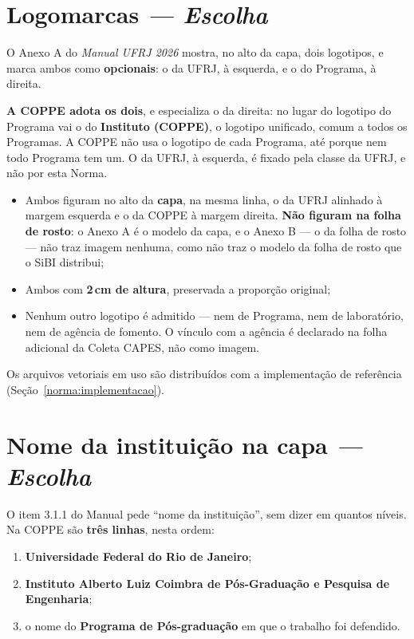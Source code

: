 \documentclass[a4paper,11pt]{article}
\newcommand\tipo[1]{\normalfont\textit{--- #1}}
\begin{document}
\hrulefill

\section{Logomarcas \tipo{Escolha}}

O Anexo A do \textit{Manual UFRJ 2026} mostra, no alto da capa, dois logotipos,
e marca ambos como \textbf{opcionais}: o da UFRJ, à esquerda, e o do Programa,
à direita.

\textbf{A COPPE adota os dois}, e especializa o da direita: no lugar do logotipo
do Programa vai o do \textbf{Instituto (COPPE)}, o logotipo unificado, comum a
todos os Programas. A COPPE não usa o logotipo de cada Programa, até porque nem
todo Programa tem um. O da UFRJ, à esquerda, é fixado pela classe da UFRJ, e não
por esta Norma.

\begin{itemize}[nosep]
  \item Ambos figuram no alto da \textbf{capa}, na mesma linha, o da UFRJ
    alinhado à margem esquerda e o da COPPE à margem direita. \textbf{Não
    figuram na folha de rosto}: o Anexo A é o modelo da capa, e o Anexo B ---
    o da folha de rosto --- não traz imagem nenhuma, como não traz o modelo da
    folha de rosto que o SiBI distribui;
  \item Ambos com \textbf{2\,cm de altura}, preservada a proporção original;
  \item Nenhum outro logotipo é admitido --- nem de Programa, nem de
    laboratório, nem de agência de fomento. O vínculo com a agência é declarado
    na folha adicional da Coleta CAPES, não como imagem.
\end{itemize}

Os arquivos vetoriais em uso são distribuídos com a implementação de referência
(Seção~\ref{norma:implementacao}).

\section{Nome da instituição na capa \tipo{Escolha}}

O item 3.1.1 do Manual pede ``nome da instituição'', sem dizer em quantos
níveis. Na COPPE são \textbf{três linhas}, nesta ordem:

\begin{enumerate}[nosep]
  \item \textbf{Universidade Federal do Rio de Janeiro};
  \item \textbf{Instituto Alberto Luiz Coimbra de Pós-Graduação e Pesquisa de
    Engenharia};
  \item o nome do \textbf{Programa de Pós-graduação} em que o trabalho foi
    defendido.
\end{enumerate}
\end{document}
